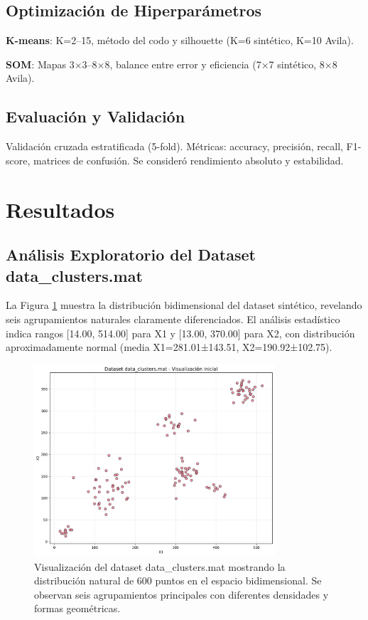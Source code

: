 \documentclass[12pt,a4paper]{article}
\begin{document}
\subsection{Optimización de Hiperparámetros}

\textbf{K-means}: K=2–15, método del codo y silhouette (K=6 sintético, K=10 Avila).

\textbf{SOM}: Mapas 3×3–8×8, balance entre error y eficiencia (7×7 sintético, 8×8 Avila).

\subsection{Evaluación y Validación}

Validación cruzada estratificada (5-fold). Métricas: accuracy, precisión, recall, F1-score, matrices de confusión. Se consideró rendimiento absoluto y estabilidad.

\section{Resultados}

\subsection{Análisis Exploratorio del Dataset data\_clusters.mat}

La Figura \ref{fig:dataset_original} muestra la distribución bidimensional del dataset sintético, revelando seis agrupamientos naturales claramente diferenciados. El análisis estadístico indica rangos [14.00, 514.00] para X1 y [13.00, 370.00] para X2, con distribución aproximadamente normal (media X1=281.01±143.51, X2=190.92±102.75).

\begin{figure}[H]
    \centering
    \includegraphics[width=0.8\textwidth]{figures/figura_01_dataset_original.pdf}
    \caption{Visualización del dataset data\_clusters.mat mostrando la distribución natural de 600 puntos en el espacio bidimensional. Se observan seis agrupamientos principales con diferentes densidades y formas geométricas.}
    \label{fig:dataset_original}
\end{figure}
\end{document}
